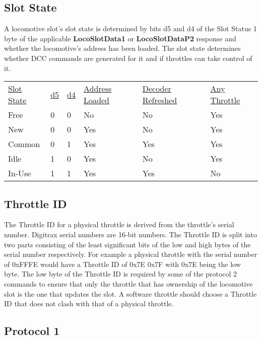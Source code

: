 \subsection{Slot State}

A locomotive slot's \gls{slot state} is determined by bits d5 and d4 of the \gls{Slot Status 1} byte of the applicable \textbf{LocoSlotData1} or \textbf{LocoSlotDataP2} response and whether the locomotive's address has been loaded. The slot state determines whether DCC commands are generated for it and if throttles can take control of it.

\begin{tabular}{l l l l l l}
\underline{Slot State} & \underline{d5} & \underline{d4} & \underline{Address Loaded} & \underline{Decoder Refreshed} & \underline{Any Throttle}\\
Free & 0 & 0 & No & No & Yes\\
New & 0 & 0 & Yes & No & Yes\\
Common & 0 & 1 & Yes & Yes & Yes\\
Idle & 1 & 0 & Yes & No & Yes\\
In-Use & 1 & 1 & Yes & Yes & No\\
\end{tabular}

\subsection{Throttle ID}

The \gls{Throttle ID} for a \gls{physical throttle} is derived from the throttle's serial number. Digitrax serial numbers are 16-bit numbers. The Throttle ID is split into two parts consisting of the least significant bits of the low and high bytes of the serial number respectively. For example a physical throttle with the serial number of 0xFFFE would have a Throttle ID of 0x7E 0x7F with 0x7E being the low byte. The low byte of the Throttle ID is required by some of the protocol 2 commands to ensure that only the throttle that has ownership of the locomotive slot is the one that updates the slot. A \gls{software throttle} should choose a Throttle ID that does not clash with that of a physical throttle.

\subsection{Protocol 1}

